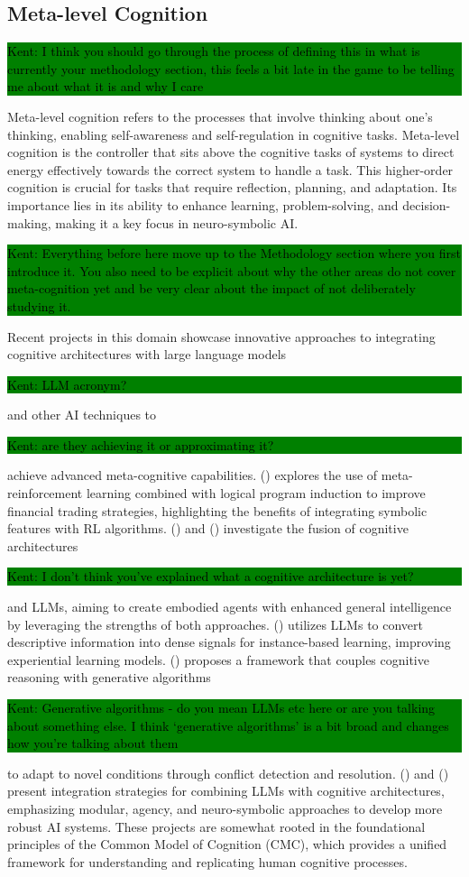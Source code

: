 \documentclass[hf]{ceurart}
\newcommand{\citeauthornum}[1]{\citeauthor{#1} (\citeyear{#1}) \cite{#1}}
\newcommand{\pinaforecomment}[4]{\colorbox{#1}{\textcolor{#4}{\parbox{.8\linewidth}{#2: #3}}}}
\newcommand{\osullikomment}[1]{\pinaforecomment{green}{Kent}{#1}{black}}
\begin{document}
\subsection{Meta-level Cognition}\label{subsec:disc_meta}
\osullikomment{I think you should go through the process of defining this in what is currently your  methodology section, this feels a bit late in the game to be telling me about what it is and why I care}
Meta-level cognition refers to the processes that involve thinking about one's thinking, enabling self-awareness and self-regulation in cognitive tasks. Meta-level cognition is the controller that sits above the cognitive tasks of systems to direct energy effectively towards the correct system to handle a task. This higher-order cognition is crucial for tasks that require reflection, planning, and adaptation. Its importance lies in its ability to enhance learning, problem-solving, and decision-making, making it a key focus in neuro-symbolic AI. 
%
\osullikomment{Everything before here move up to the Methodology section where you first introduce it. You also need to be explicit about why the other areas do not cover meta-cognition yet and be very clear about the impact of not deliberately studying it.}
%
Recent projects in this domain showcase innovative approaches to integrating cognitive architectures with large language models \osullikomment{LLM acronym?} and other AI techniques to \osullikomment{are they achieving it or approximating it?} achieve advanced meta-cognitive capabilities.  \citeauthornum{Harini2023} explores the use of meta-reinforcement learning combined with logical program induction to improve financial trading strategies, highlighting the benefits of integrating symbolic features with RL algorithms. \citeauthornum{Joshi2024} and \citeauthornum{Liu2024} investigate the fusion of cognitive architectures \osullikomment{I don't think you've explained what a cognitive architecture is yet?} and LLMs, aiming to create embodied agents with enhanced general intelligence by leveraging the strengths of both approaches. \citeauthornum{McDonald2024} utilizes LLMs to convert descriptive information into dense signals for instance-based learning, improving experiential learning models. \citeauthornum{Raja2024} proposes a framework that couples cognitive reasoning with generative algorithms \osullikomment{Generative algorithms - do you mean LLMs etc here or are you talking about something else. I think `generative algorithms' is a bit broad and changes how you're talking about them} to adapt to novel conditions through conflict detection and resolution. \citeauthornum{Romero2024} and \citeauthornum{Sumers2023} present integration strategies for combining LLMs with cognitive architectures, emphasizing modular, agency, and neuro-symbolic approaches to develop more robust AI systems. These projects are somewhat rooted in the foundational principles of the Common Model of Cognition (CMC), which provides a unified framework for understanding and replicating human cognitive processes.
\end{document}
